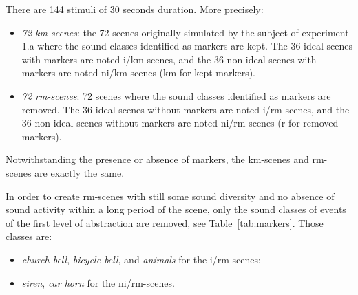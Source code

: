 \documentclass[12pt]{elsarticle}
\newcommand{\ie}{\emph{i.\,e.}}
\newcommand{\cf}{cf.}
\begin{document}
There are 144 stimuli of 30 seconds duration. More precisely:

\begin{itemize}
\item \emph{72 km-scenes}: the 72 scenes originally simulated by the subject of experiment 1.a where the sound classes identified as markers are kept. The 36 ideal scenes with markers are noted i/km-scenes, and the 36 non ideal scenes with markers are noted ni/km-scenes (km for kept markers).
\item \emph{72 rm-scenes}:  72 scenes where the sound classes identified as markers are removed. The 36 ideal scenes without markers are noted i/rm-scenes, and the 36 non ideal scenes without markers are noted ni/rm-scenes (r for removed markers).
\end{itemize}


Notwithstanding the presence or absence of markers, the km-scenes and rm-scenes are exactly the same.


In order to create rm-scenes with still some sound diversity and no  absence of sound activity within a long period of the scene, only the sound classes of events of the first level of abstraction are removed, see Table~\ref{tab:markers}. Those classes are:


\begin{itemize}
\item \emph{church bell}, \emph{bicycle bell}, and \emph{animals} for the i/rm-scenes;
\item \emph{siren}, \emph{car horn} for the ni/rm-scenes.
\end{itemize}

\end{document}
